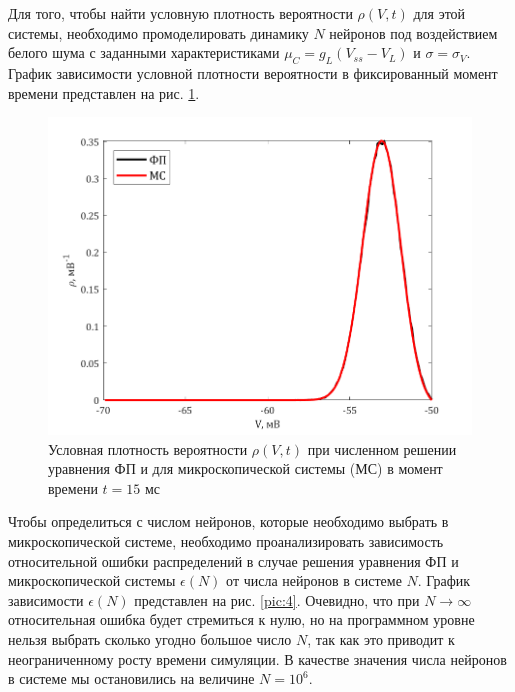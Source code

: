 Для того, чтобы найти условную плотность вероятности $\rho(V,t)$ для этой системы, необходимо промоделировать динамику $N$ нейронов под воздействием белого шума с заданными характеристиками $\mu_C=g_L(V_{ss}-V_L)$ и $\sigma=\sigma_V$. 
График зависимости условной плотности вероятности в фиксированный момент времени представлен на рис. \ref{pic:3}.
\begin{figure}[H]
	\centering
	\includegraphics[width=\linewidth]{pic/rhomicro.png}
	\caption{Условная плотность вероятности $\rho(V,t)$ при численном решении уравнения ФП и для микроскопической системы (МС) в момент времени $t=15\text{ мс}$}
	\label{pic:3}
\end{figure}
Чтобы определиться с числом нейронов, которые необходимо выбрать в микроскопической системе, необходимо проанализировать зависимость относительной ошибки распределений в случае решения уравнения ФП и микроскопической системы $\epsilon(N)$ от числа нейронов в системе $N$. График зависимости $\epsilon(N)$ представлен на рис. \ref{pic:4}. Очевидно, что при $N\to\infty$ относительная ошибка будет стремиться к нулю, но на программном уровне нельзя выбрать сколько угодно большое число $N$, так как это приводит к неограниченному росту времени симуляции. В качестве значения числа нейронов в системе мы остановились на величине $N=10^6$.
